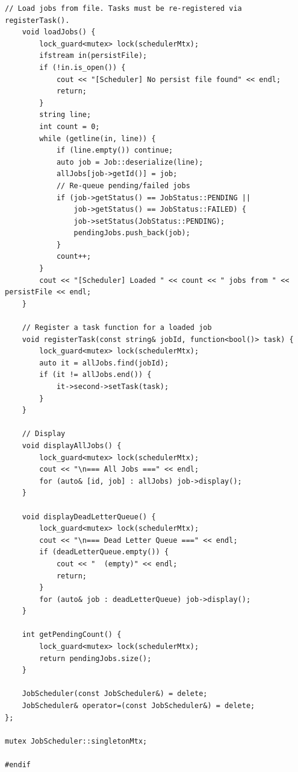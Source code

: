\documentclass[11pt,a4paper]{article}
\begin{document}
\begin{lstlisting}[title={\texttt{managers.hpp}}]
    // Load jobs from file. Tasks must be re-registered via registerTask().
    void loadJobs() {
        lock_guard<mutex> lock(schedulerMtx);
        ifstream in(persistFile);
        if (!in.is_open()) {
            cout << "[Scheduler] No persist file found" << endl;
            return;
        }
        string line;
        int count = 0;
        while (getline(in, line)) {
            if (line.empty()) continue;
            auto job = Job::deserialize(line);
            allJobs[job->getId()] = job;
            // Re-queue pending/failed jobs
            if (job->getStatus() == JobStatus::PENDING ||
                job->getStatus() == JobStatus::FAILED) {
                job->setStatus(JobStatus::PENDING);
                pendingJobs.push_back(job);
            }
            count++;
        }
        cout << "[Scheduler] Loaded " << count << " jobs from " << persistFile << endl;
    }

    // Register a task function for a loaded job
    void registerTask(const string& jobId, function<bool()> task) {
        lock_guard<mutex> lock(schedulerMtx);
        auto it = allJobs.find(jobId);
        if (it != allJobs.end()) {
            it->second->setTask(task);
        }
    }

    // Display
    void displayAllJobs() {
        lock_guard<mutex> lock(schedulerMtx);
        cout << "\n=== All Jobs ===" << endl;
        for (auto& [id, job] : allJobs) job->display();
    }

    void displayDeadLetterQueue() {
        lock_guard<mutex> lock(schedulerMtx);
        cout << "\n=== Dead Letter Queue ===" << endl;
        if (deadLetterQueue.empty()) {
            cout << "  (empty)" << endl;
            return;
        }
        for (auto& job : deadLetterQueue) job->display();
    }

    int getPendingCount() {
        lock_guard<mutex> lock(schedulerMtx);
        return pendingJobs.size();
    }

    JobScheduler(const JobScheduler&) = delete;
    JobScheduler& operator=(const JobScheduler&) = delete;
};

mutex JobScheduler::singletonMtx;

#endif
\end{lstlisting}

\newpage
\end{document}
